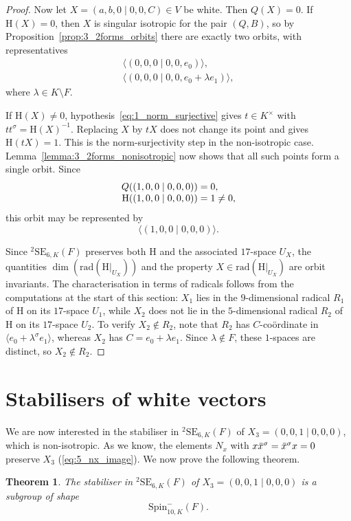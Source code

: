 \documentclass{amsart}
\def\ovx{\mathord{\mbox{\hspace*{0pt}}\,\overline{\!x\!\!\;}\!\:}\mbox{\hspace*{0pt}}}
\newcommand{\SE}{\mathrm{SE}}
\newcommand{\Spin}{\mathrm{Spin}}
\newcommand{\rad}{\mathrm{rad}}
\renewcommand{\H}{\mathrm{H}}
\newcommand{\s}{\sigma}
\theoremstyle{plain}
\newtheorem{theorem}{Theorem}
\numberwithin{theorem}{section}
\theoremstyle{definition}
\begin{document}
\begin{proof}
	Now let $X=(a,b,0\mid 0,0,C)\in V$ be white. Then $Q(X)=0$. If $\H(X)=0$, then $X$ is singular isotropic for the pair $(Q,B)$, so by
	Proposition~\ref{prop:3_2forms_orbits} there are exactly two orbits, with representatives
	\[
		\begin{array}{l}
			\langle (0,0,0\mid 0,0,e_0)\rangle,\\
			\langle (0,0,0\mid 0,0,e_0+\lambda e_1)\rangle,
		\end{array}
	\]
	where $\lambda\in K\setminus F$.

	If $\H(X)\neq0$, hypothesis~\eqref{eq:1_norm_surjective} gives
	$t\in K^{\times}$ with $tt^{\s}=\H(X)^{-1}$. Replacing $X$ by $tX$
	does not change its point and gives $\H(tX)=1$.
	This is the norm-surjectivity step in the non-isotropic case.
	Lemma~\ref{lemma:3_2forms_nonisotropic} now shows that all such points form
	a single orbit.
	Since
	\[
		\begin{array}{r@{\;}c@{\;}l}
			Q((1,0,0\mid 0,0,0))&=&0,\\
			\H((1,0,0\mid 0,0,0))&=&1\neq0,
		\end{array}
	\]
	this orbit may be represented by
	\[
		\langle (1,0,0\mid 0,0,0)\rangle.
	\]

	Since ${}^2\SE_{6,K}(F)$ preserves both $\H$ and the associated $17$-space $U_X$,
	the quantities $\dim(\rad(\H|_{U_X}))$ and the property $X\in\rad(\H|_{U_X})$
	are orbit invariants. The characterisation in terms of radicals follows from the computations at the start of
	this section: $X_1$ lies in the $9$-dimensional radical $R_1$ of $\H$ on its $17$-space $U_1$,
	while $X_2$ does not lie in the $5$-dimensional radical $R_2$ of $\H$ on its $17$-space $U_2$.
	To verify $X_2 \notin R_2$, note that $R_2$ has $C$-co\"{o}rdinate in
	$\langle e_0 + \lambda^{\s} e_1\rangle$, whereas $X_2$ has $C = e_0 + \lambda e_1$.
	Since $\lambda \notin F$, these $1$-spaces are distinct, so $X_2 \notin R_2$.
\end{proof}

\section{Stabilisers of white vectors}

We are now interested in the stabiliser in ${}^2\SE_{6,K}(F)$ of 
$X_3 = (0,0,1\mid 0,0,0)$, which is non-isotropic. As we know, the elements
$N_x$ with $x\ovx^{\s} = \ovx^{\s}x = 0$ preserve $X_3$ (\ref{eq:5_nx_image}).
We now prove the following theorem.
\begin{theorem}
	\label{theorem:7_type3_stabiliser}
	The stabiliser in ${}^2\SE_{6,K}(F)$ of $X_3 = (0,0,1\mid 0,0,0)$ is a subgroup of shape
	\begin{equation}
		\Spin_{10,K}^{-}(F).
	\end{equation}
\end{theorem}
\end{document}
